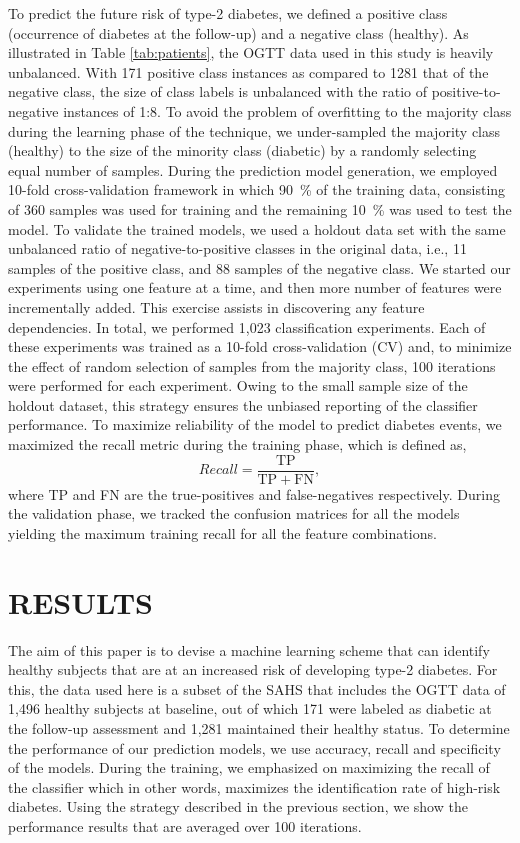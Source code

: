 \documentclass[a4paper,twoside]{article}
\begin{document}
To predict the future risk of type-2 diabetes, we defined a positive class (occurrence of diabetes at the follow-up) and a negative class (healthy). As illustrated in Table \ref{tab:patients}, the OGTT data used in this study is heavily unbalanced. With \num{171} positive class instances as compared to \num{1281} that of the negative class, the size of class labels is unbalanced with the ratio of positive-to-negative instances of 1:8. To avoid the problem of overfitting to the majority class during the learning phase of the technique, we under-sampled the majority class (healthy) to the size of the minority class (diabetic) by a randomly selecting equal number of samples. During the prediction model generation, we employed 10-fold cross-validation framework in which \SI{90}{\percent} of the training data, consisting of \num{360} samples was used for training and the remaining \SI{10}{\percent} was used to test the model. To validate the trained models, we used a holdout data set with the same unbalanced ratio of negative-to-positive classes in the original data, i.e., \num{11} samples of the positive class, and \num{88} samples of the negative class. We started our experiments using one feature at a time, and then more number of features were incrementally added. This exercise assists in discovering any feature dependencies. In total, we performed 1,023 classification experiments.  Each of these experiments was trained as a 10-fold cross-validation (CV) and, to minimize the effect of random selection of samples from the majority class, \num{100} iterations were performed for each experiment. Owing to the small sample size of the holdout dataset, this strategy ensures the unbiased reporting of the classifier performance. To maximize reliability of the model to predict diabetes events, we maximized the recall metric during the training phase, which is defined as,
%
\begin{equation}
    Recall = \frac{\mathrm{TP}}{\mathrm{TP} + \mathrm{FN}},
\end{equation}
%
where TP and FN are the true-positives and false-negatives respectively. During the validation phase, we tracked the confusion matrices for all the models yielding the maximum training recall for all the feature combinations.
%
\section{\uppercase{Results}}
%
The aim of this paper is to devise a machine learning scheme that can identify healthy subjects that are at an increased risk of developing type-2 diabetes. For this, the data used here is a subset of the SAHS that includes the OGTT data of 1,496 healthy subjects at baseline, out of which \num{171} were labeled as diabetic at the follow-up assessment and 1,281 maintained their healthy status. To determine the performance of our prediction models, we use accuracy, recall and specificity of the models. During the training, we emphasized on maximizing the recall of the classifier which in other words, maximizes the identification rate of high-risk diabetes. Using the strategy described in the previous section, we show the performance results that are averaged over \num{100} iterations.
%
\end{document}
